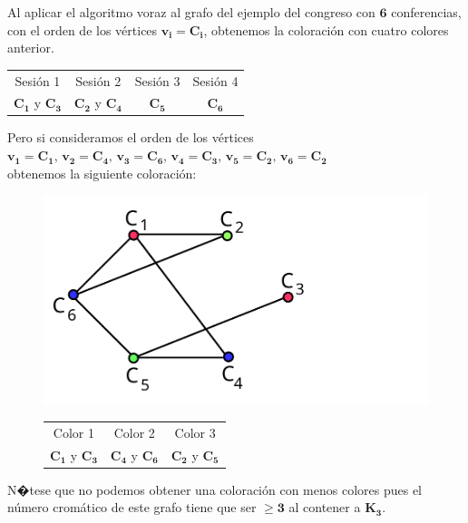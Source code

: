 \documentclass[ebook,oneside]{memoir}
\newcommand{\bolds}[1]{\boldsymbol{#1}}
\begin{document}
\vspace{0.4cm}
Al aplicar el algoritmo voraz al grafo del ejemplo del congreso con $\bolds{6}$ conferencias, con el orden de los v\'{e}rtices $\bolds{v_i=C_i}$,
obtenemos la coloraci\'{o}n con cuatro colores anterior.
\vspace{0.4cm}

      \begin{center}
            \begin{tabular}{cccc}
                  Sesi\'{o}n 1 & Sesi\'{o}n 2 & Sesi\'{o}n 3 & Sesi\'{o}n 4 \\
                  $\bolds{C_1}$ y $\bolds{C_3}$ & $\bolds{C_2}$ y $\bolds{C_4}$ & $\bolds{C_5}$ & $\bolds{C_6}$
            \end{tabular}
      \end{center}

\vspace{0.4cm}
Pero si consideramos el orden de los v\'{e}rtices\\
$\bolds{v_1=C_1,\,v_2=C_4,\,v_3=C_6,\,v_4=C_3,\,v_5=C_2,\,v_6=C_2}$\\
obtenemos la siguiente coloraci\'{o}n:
\vspace{0.4cm}

           \begin{figure}[h!]\centering
           \includegraphics[scale=0.3]{color7.pdf}
           \begin{tabular}{ccc}
            Color 1 & Color 2 & Color 3 \\
            $\bolds{C_1}$ y $\bolds{C_3}$ & $\bolds{C_4}$ y $\bolds{C_6}$ & $\bolds{C_2}$ y $\bolds{C_5}$
           \end{tabular}
           \end{figure}


\vspace{0.4cm}
N�tese que no podemos obtener una coloraci\'{o}n con menos colores pues el n\'{u}mero crom\'{a}tico de este grafo tiene que ser $\bolds{\geq 3}$ al contener a $\bolds{K_3}$.
\vspace{0.4cm}
\end{document}
